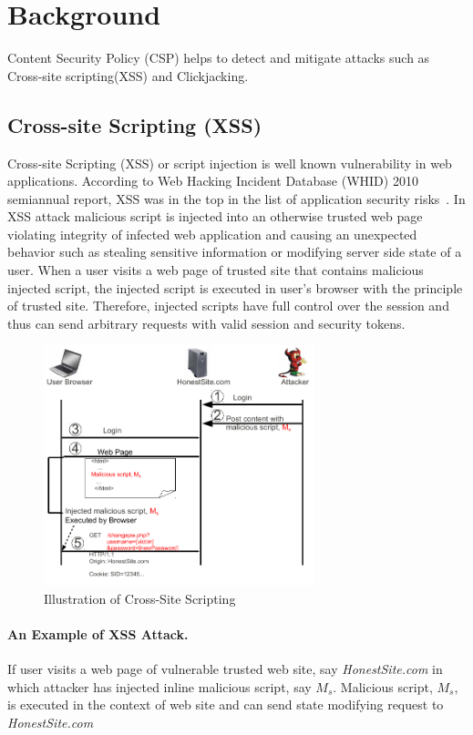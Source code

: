 \section{Background}
\label{sec:back}
Content Security Policy (CSP) helps to detect and mitigate attacks
such as Cross-site scripting(XSS) and Clickjacking.
 
\subsection{Cross-site Scripting (XSS)}
Cross-site Scripting (XSS) or script injection is well known
vulnerability in web applications. According to Web Hacking Incident
Database (WHID) 2010 semiannual report, XSS was in the top in the list
of application security risks~\cite{WHID-2010report}.  In XSS attack
malicious script is injected into an otherwise trusted web page
violating integrity of infected web application and causing an
unexpected behavior such as stealing sensitive information or
modifying server side state of a user. When a user visits a web page
of trusted site that contains malicious injected script, the injected
script is executed in user's browser with the principle of trusted
site. Therefore, injected scripts have full control over the session and
thus can send arbitrary requests with valid session and security
tokens.

\begin{figure}[h!]
\begin{center}
\includegraphics[width=0.7\textwidth]{xss-example}
\end{center}
\caption{Illustration of Cross-Site Scripting}
\label{fig:xssIll}
\end{figure}

\paragraph{\bf An Example of XSS Attack.}
If user visits a web page of vulnerable trusted web site, say {\em
  HonestSite.com} in which attacker has injected inline malicious
script, say $M_{s}$. Malicious script, $M_s$, is executed in the
context of web site and can send state modifying request to {\em
  HonestSite.com}

